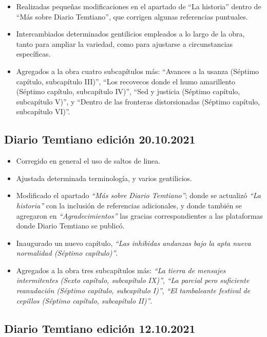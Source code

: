 \documentclass[
]{book}
\begin{document}
\begin{itemize}
\item
  Realizadas pequeñas modificaciones en el apartado de ``La historia'' dentro de ``Más sobre Diario Temtiano'', que corrigen algunas referencias puntuales.
\item
  Intercambiados determinados gentilicios empleados a lo largo de la obra, tanto para ampliar la variedad, como para ajustarse a circunstancias específicas.
\item
  Agregados a la obra cuatro subcapítulos más: ``Avances a la usanza (Séptimo capítulo, subcapítulo III)'', ``Los recovecos donde el humo amarillento (Séptimo capítulo, subcapítulo IV)'', ``Sed y justicia (Séptimo capítulo, subcapítulo V)'', y ``Dentro de las fronteras distorsionadas (Séptimo capítulo, subcapítulo VI)''.
\end{itemize}

\hypertarget{diario-temtiano-ediciuxf3n-20.10.2021}{%
\subsection*{Diario Temtiano edición 20.10.2021}\label{diario-temtiano-ediciuxf3n-20.10.2021}}

\begin{itemize}
\item
  Corregido en general el uso de saltos de linea.
\item
  Ajustada determinada terminología, y varios gentilicios.
\item
  Modificado el apartado \emph{``Más sobre Diario Temtiano''}; donde se actualizó \emph{``La historia''} con la inclusión de referencias adicionales, y donde también se agregaron en \emph{``Agradecimientos''} las gracias correspondientes a las plataformas donde Diario Temtiano se publicó.
\item
  Inaugurado un nuevo capítulo, \emph{``Las inhibidas andanzas bajo la apta nueva normalidad (Séptimo capítulo)''}.
\item
  Agregados a la obra tres subcapítulos más: \emph{``La tierra de mensajes intermitentes (Sexto capítulo, subcapítulo IX)''}, \emph{``La parcial pero suficiente reanudación (Séptimo capítulo, subcapítulo I)''}, \emph{``El tambaleante festival de cepillos (Séptimo capítulo, subcapítulo II)''}.
\end{itemize}

\hypertarget{diario-temtiano-ediciuxf3n-12.10.2021}{%
\subsection*{Diario Temtiano edición 12.10.2021}\label{diario-temtiano-ediciuxf3n-12.10.2021}}
\end{document}
